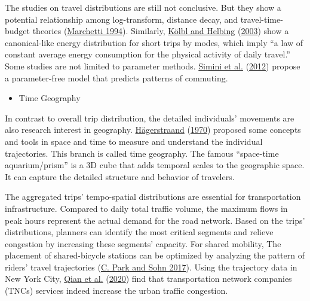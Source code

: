 \documentclass[
  12pt,
]{article}
\providecommand{\tightlist}{%
  \setlength{\itemsep}{0pt}\setlength{\parskip}{0pt}}
\begin{document}
The studies on travel distributions are still not conclusive. But they show a potential relationship among log-transform, distance decay, and travel-time-budget theories (\protect\hyperlink{ref-marchettiAnthropologicalInvariantsTravel1994}{Marchetti 1994}). Similarly, \protect\hyperlink{ref-kolblEnergyLawsHuman2003}{Kölbl and Helbing} (\protect\hyperlink{ref-kolblEnergyLawsHuman2003}{2003}) show a canonical-like energy distribution for short trips by modes, which imply ``a law of constant average energy consumption for the physical activity of daily travel.'' Some studies are not limited to parameter methods. \protect\hyperlink{ref-siminiUniversalModelMobility2012}{Simini et al.} (\protect\hyperlink{ref-siminiUniversalModelMobility2012}{2012}) propose a parameter-free model that predicts patterns of commuting.

\begin{itemize}
\tightlist
\item
  Time Geography
\end{itemize}

In contrast to overall trip distribution, the detailed individuals' movements are also research interest in geography. \protect\hyperlink{ref-hagerstraandWhatPeopleRegional1970}{Hägerstraand} (\protect\hyperlink{ref-hagerstraandWhatPeopleRegional1970}{1970}) proposed some concepts and tools in space and time to measure and understand the individual trajectories. This branch is called time geography. The famous ``space-time aquarium/prism'' is a 3D cube that adds temporal scales to the geographic space. It can capture the detailed structure and behavior of travelers.

The aggregated trips' tempo-spatial distributions are essential for transportation infrastructure. Compared to daily total traffic volume, the maximum flows in peak hours represent the actual demand for the road network. Based on the trips' distributions, planners can identify the most critical segments and relieve congestion by increasing these segments' capacity. For shared mobility, The placement of shared-bicycle stations can be optimized by analyzing the pattern of riders' travel trajectories (\protect\hyperlink{ref-parkOptimizationApproachPlacement2017}{C. Park and Sohn 2017}). Using the trajectory data in New York City, \protect\hyperlink{ref-qianImpactTransportationNetwork2020}{Qian et al.} (\protect\hyperlink{ref-qianImpactTransportationNetwork2020}{2020}) find that transportation network companies (TNCs) services indeed increase the urban traffic congestion.
\end{document}
